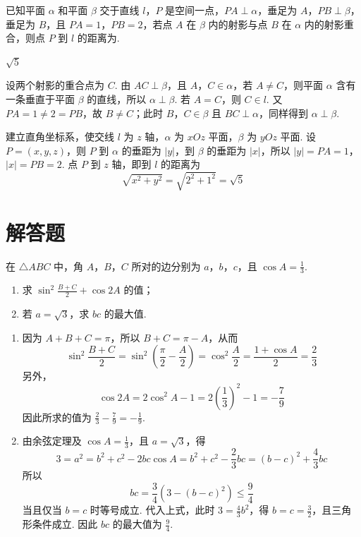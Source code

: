\begin{problem}
已知平面 \(\alpha\) 和平面 \(\beta\) 交于直线 \(l\)，\(P\) 是空间一点，\(PA\perp \alpha\)，垂足为 \(A\)，\(PB\perp \beta\)，垂足为 \(B\)，且 \(PA=1\)，\(PB=2\)，若点 \(A\) 在 \(\beta\) 内的射影与点 \(B\) 在 \(\alpha\) 内的射影重合，则点 \(P\) 到 \(l\) 的距离为\fillinblank{}.
\end{problem}

\begin{answer}
\(\sqrt{5}\)
\end{answer}

\begin{solution}
设两个射影的重合点为 \(C\). 由 \(AC\perp\beta\)，且 \(A\)，\(C\in\alpha\)，若 \(A\ne C\)，则平面 \(\alpha\) 含有一条垂直于平面 \(\beta\) 的直线，所以 \(\alpha\perp\beta\). 若 \(A=C\)，则 \(C\in l\). 又 \(PA=1\ne2=PB\)，故 \(B\ne C\)；此时 \(B\)，\(C\in\beta\) 且 \(BC\perp\alpha\)，同样得到 \(\alpha\perp\beta\).

建立直角坐标系，使交线 \(l\) 为 \(z\) 轴，\(\alpha\) 为 \(xOz\) 平面，\(\beta\) 为 \(yOz\) 平面. 设 \(P=(x,y,z)\)，则 \(P\) 到 \(\alpha\) 的垂距为 \(|y|\)，到 \(\beta\) 的垂距为 \(|x|\)，所以
\(|y|=PA=1\)，\(|x|=PB=2\).
点 \(P\) 到 \(z\) 轴，即到 \(l\) 的距离为
\[
\sqrt{x^2+y^2}=\sqrt{2^2+1^2}=\sqrt5
\]
\end{solution}

\section{解答题}
\begin{problem}
在 \(\triangle ABC\) 中，角 \(A\)，\(B\)，\(C\) 所对的边分别为 \(a\)，\(b\)，\(c\)，且 \(\cos A=\frac{1}{3}\).
\begin{enumerate}
\item 求 \(\sin^{2}\frac{B+C}{2}+\cos 2A\) 的值；
\item 若 \(a=\sqrt{3}\)，求 \(bc\) 的最大值.
\end{enumerate}
\end{problem}

\begin{solution}
\begin{enumerate}
\item 因为 \(A+B+C=\pi\)，所以 \(B+C=\pi-A\)，从而
\[
\sin^2\frac{B+C}{2}
=\sin^2\left(\frac{\pi}{2}-\frac A2\right)
=\cos^2\frac A2
=\frac{1+\cos A}{2}
=\frac23
\]
另外，
\[
\cos 2A=2\cos^2A-1=2\left(\frac13\right)^2-1=-\frac79
\]
因此所求的值为
\(\frac23-\frac79=-\frac19\).
\item 由余弦定理及 \(\cos A=\frac13\)，且 \(a=\sqrt3\)，得
\[
3=a^2=b^2+c^2-2bc\cos A=b^2+c^2-\frac23bc
=(b-c)^2+\frac43bc
\]
所以
\[
bc=\frac34\left(3-(b-c)^2\right)\leqslant\frac94
\]
当且仅当 \(b=c\) 时等号成立. 代入上式，此时
\(3=\frac43b^2\)，得 \(b=c=\frac32\)，且三角形条件成立. 因此 \(bc\) 的最大值为 \(\frac94\).
\end{enumerate}
\end{solution}

